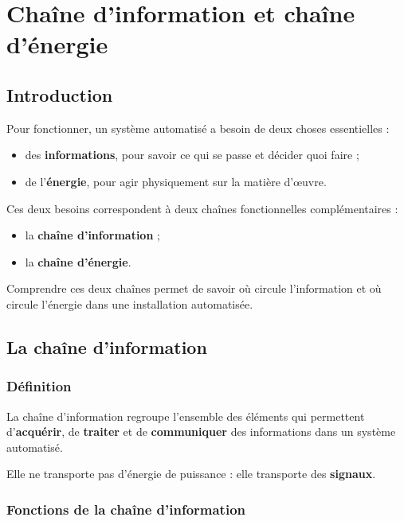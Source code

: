 \section{Chaîne d'information et chaîne d'énergie}

\subsection{Introduction}

Pour fonctionner, un système automatisé a besoin de deux choses essentielles :

\begin{itemize}
    \item des \textbf{informations}, pour savoir ce qui se passe et décider quoi faire ;
    \item de l'\textbf{énergie}, pour agir physiquement sur la matière d'œuvre.
\end{itemize}

Ces deux besoins correspondent à deux chaînes fonctionnelles complémentaires :

\begin{itemize}
    \item la \textbf{chaîne d'information} ;
    \item la \textbf{chaîne d'énergie}.
\end{itemize}

Comprendre ces deux chaînes permet de savoir où circule l'information et où circule l'énergie dans une installation automatisée.

\subsection{La chaîne d'information}

\subsubsection{Définition}

La chaîne d'information regroupe l'ensemble des éléments qui permettent d'\textbf{acquérir}, de \textbf{traiter} et de \textbf{communiquer} des informations dans un système automatisé.

Elle ne transporte pas d'énergie de puissance : elle transporte des \textbf{signaux}.

\subsubsection{Fonctions de la chaîne d'information}


